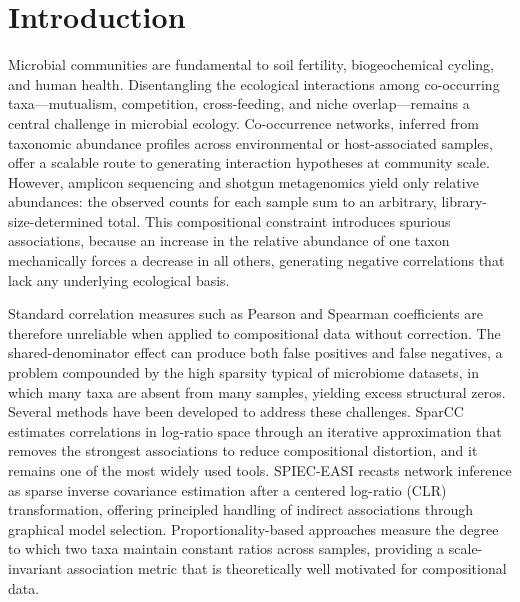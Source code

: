 \documentclass[fleqn]{nature}
\begin{document}
\section*{Introduction}

Microbial communities are fundamental to soil fertility, biogeochemical cycling, and human health.
Disentangling the ecological interactions among co-occurring taxa---mutualism, competition, cross-feeding, and niche overlap---remains a central challenge in microbial ecology.
Co-occurrence networks, inferred from taxonomic abundance profiles across environmental or host-associated samples, offer a scalable route to generating interaction hypotheses at community scale\cite{friedman2012,kurtz2015}.
However, amplicon sequencing and shotgun metagenomics yield only relative abundances: the observed counts for each sample sum to an arbitrary, library-size-determined total.
This compositional constraint introduces spurious associations, because an increase in the relative abundance of one taxon mechanically forces a decrease in all others, generating negative correlations that lack any underlying ecological basis\cite{lovell2015,lin2020}.

Standard correlation measures such as Pearson and Spearman coefficients are therefore unreliable when applied to compositional data without correction.
The shared-denominator effect can produce both false positives and false negatives, a problem compounded by the high sparsity typical of microbiome datasets, in which many taxa are absent from many samples, yielding excess structural zeros.
Several methods have been developed to address these challenges.
SparCC\cite{friedman2012} estimates correlations in log-ratio space through an iterative approximation that removes the strongest associations to reduce compositional distortion, and it remains one of the most widely used tools.
SPIEC-EASI\cite{kurtz2015} recasts network inference as sparse inverse covariance estimation after a centered log-ratio (CLR) transformation, offering principled handling of indirect associations through graphical model selection.
Proportionality-based approaches\cite{lovell2015} measure the degree to which two taxa maintain constant ratios across samples, providing a scale-invariant association metric that is theoretically well motivated for compositional data.
\end{document}

